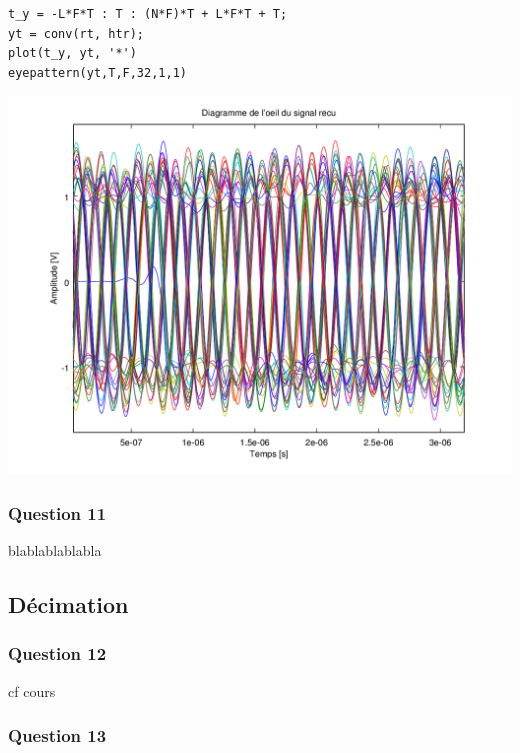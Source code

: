 \documentclass{acm_proc_article-sp}
\begin{document}
\begin{center}
\begin{lstlisting}
t_y = -L*F*T : T : (N*F)*T + L*F*T + T;
yt = conv(rt, htr);
plot(t_y, yt, '*')
eyepattern(yt,T,F,32,1,1)
\end{lstlisting}

\includegraphics[scale=0.45]{oeil.png}
\end{center}
\subsubsection{Question 11}

blablablablabla

\subsection{Décimation}

\subsubsection{Question 12}

cf cours

\subsubsection{Question 13}
\end{document}
